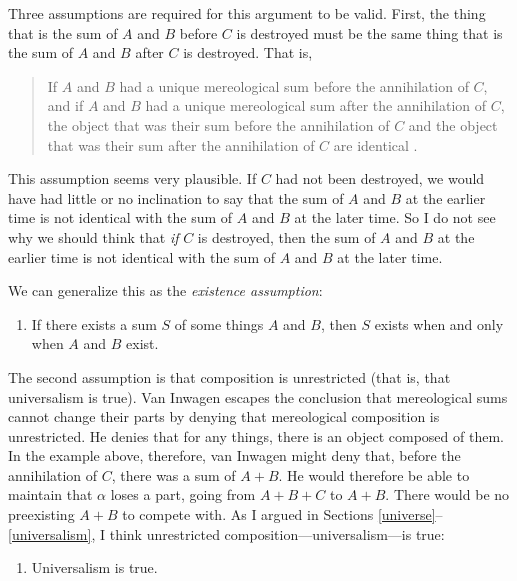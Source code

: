 \documentclass[12pt,twoside]{reedfancy}
\begin{document}
\begin{spacing}{1.25}
Three assumptions are required for this argument to be valid.  First,
the thing that is the sum of $A$ and $B$ before $C$ is destroyed must
be the same thing that is the sum of $A$ and $B$ after $C$ is
destroyed.  That is,

\begin{quote}
If $A$ and $B$ had a unique mereological sum before the annihilation
of $C$, and if $A$ and $B$ had a unique mereological sum after the
annihilation of $C$, the object that was their sum before the
annihilation of $C$ and the object that was their sum after the
annihilation of $C$ are identical \citep[629]{inwagen2006}.
\end{quote}

This assumption seems very plausible.  If $C$ had not been destroyed,
we would have had little or no inclination to say that the sum of $A$
and $B$ at the earlier time is not identical with the sum of $A$ and
$B$ at the later time.  So I do not see why we should think that {\em
  if} $C$ is destroyed, then the sum of $A$ and $B$ at the earlier
time is not identical with the sum of $A$ and $B$ at the later time.

We can generalize this as the {\em existence assumption}:

\begin{enumerate}[ref=(\arabic*)]
  \item If there exists a sum $S$ of some things $A$ and $B$, then $S$
    exists when and only when $A$ and $B$ exist. \label{ass-ex}
\end{enumerate}

The second assumption is that composition is unrestricted (that is,
that universalism is true).  Van Inwagen escapes the conclusion that
mereological sums cannot change their parts by denying that
mereological composition is unrestricted.  He denies that for any
things, there is an object composed of them.  In the example above,
therefore, van Inwagen might deny that, before the annihilation of
$C$, there was a sum of $A + B$.  He would therefore be able to
maintain that $\alpha$ loses a part, going from $A + B + C$ to $A +
B$.  There would be no preexisting $A + B$ to compete with.  As I
argued in Sections \ref{universe}--\ref{universalism}, I think
unrestricted composition---universalism---is true:

\begin{enumerate}[start=2, ref=(\arabic*)]
  \item Universalism is true. \label{ass-uni}
\end{enumerate}


\end{spacing}
\end{document}
